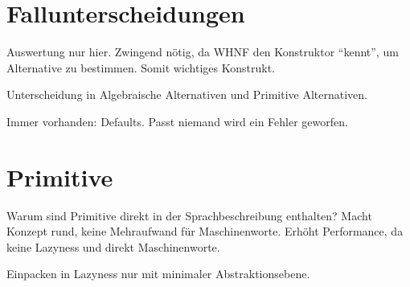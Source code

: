 \section{Fallunterscheidungen}

Auswertung nur hier.
Zwingend nötig, da WHNF den Konstruktor ``kennt'', um Alternative zu bestimmen.
Somit wichtiges Konstrukt.

Unterscheidung in Algebraische Alternativen und Primitive Alternativen.

Immer vorhanden: Defaults.
Passt niemand wird ein Fehler geworfen.

\section{Primitive}

Warum sind Primitive direkt in der Sprachbeschreibung enthalten?
Macht Konzept rund, keine Mehraufwand für Maschinenworte.
Erhöht Performance, da keine Lazyness und direkt Maschinenworte.

Einpacken in Lazyness nur mit minimaler Abstraktionsebene.



